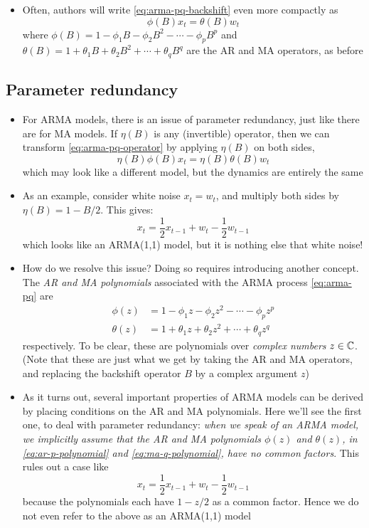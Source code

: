 \documentclass{article}
\begin{document}
\begin{itemize}
\item Often, authors will write \eqref{eq:arma-pq-backshift} even more compactly
  as    
  \begin{equation}
  \label{eq:arma-pq-operator}
  \phi(B) x_t = \theta(B) w_t  
  \end{equation}
  where $\phi(B) = 1 - \phi_1 B - \phi_2 B^2 - \cdots - \phi_p B^p$ and
  $\theta(B) = 1 + \theta_1 B + \theta_2 B^2 + \cdots + \theta_q B^q$ are the AR 
  and MA operators, as before 
\end{itemize}

\subsection{Parameter redundancy}

\begin{itemize}
\item For ARMA models, there is an issue of parameter redundancy, just like
  there are for MA models. If $\eta(B)$ is any (invertible) operator, then we
  can transform \eqref{eq:arma-pq-operator} by applying $\eta(B)$ on both sides,  
  \[
  \eta(B) \phi(B) x_t = \eta(B) \theta(B) w_t  
  \]
  which may look like a different model, but the dynamics are entirely the
  same  

\item As an example, consider white noise $x_t = w_t$, and multiply both sides
  by $\eta(B) = 1 - B/2$. This gives:
  \[
  x_t = \frac{1}{2} x_{t-1} + w_t - \frac{1}{2} w_{t-1}
  \]
  which looks like an ARMA(1,1) model, but it is nothing else that white noise!
 
\item How do we resolve this issue? Doing so requires introducing another
  concept. The \emph{AR and MA polynomials} associated with the ARMA process
  \eqref{eq:arma-pq} are 
  \begin{align}
  \label{eq:ar-p-polynomial}
  \phi(z) &= 1 - \phi_1 z - \phi_2 z^2 - \cdots - \phi_p z^p \\
  \label{eq:ma-q-polynomial}
  \theta(z) &= 1 + \theta_1 z + \theta_2 z^2 + \cdots + \theta_q z^q
  \end{align}
  respectively. To be clear, these are polynomials over \emph{complex numbers}
  $z \in \mathbb{C}$. (Note that these are just what we get by taking the AR and MA
  operators, and replacing the backshift operator $B$ by a complex argument $z$) 

\item As it turns out, several important properties of ARMA models can be 
  derived by placing conditions on the AR and MA polynomials. Here we'll see the
  first one, to deal with parameter redundancy: \emph{when we speak of an ARMA
    model, we implicitly assume that the AR and MA polynomials $\phi(z)$ and
    $\theta(z)$, in \eqref{eq:ar-p-polynomial} and \eqref{eq:ma-q-polynomial},
    have no common factors}. This rules out a case like   
  \[
  x_t = \frac{1}{2} x_{t-1} + w_t - \frac{1}{2} w_{t-1}
  \]
  because the polynomials each have $1-z/2$ as a common factor. Hence we do not  
  even refer to the above as an ARMA(1,1) model
\end{itemize}
\end{document}
